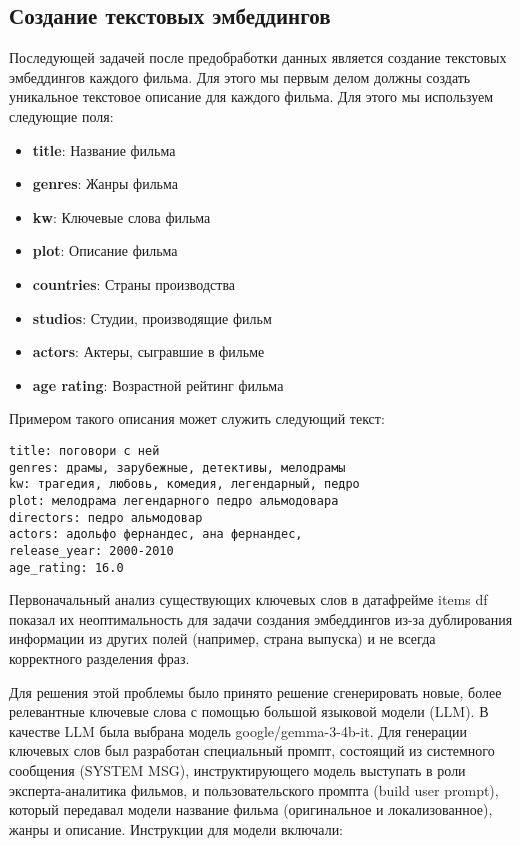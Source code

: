 \subsection*{Создание текстовых эмбеддингов}

Последующей задачей после предобработки данных является создание текстовых эмбеддингов каждого фильма. Для этого мы первым делом должны создать уникальное текстовое описание для каждого фильма. Для этого мы используем следующие поля:
\begin{itemize}
    \item \textbf{title}: Название фильма
    \item \textbf{genres}: Жанры фильма
    \item \textbf{kw}: Ключевые слова фильма
    \item \textbf{plot}: Описание фильма
    \item \textbf{countries}: Страны производства
    \item \textbf{studios}: Студии, производящие фильм
    \item \textbf{actors}: Актеры, сыгравшие в фильме
    \item \textbf{age rating}: Возрастной рейтинг фильма
\end{itemize}

Примером такого описания может служить следующий текст:
\begin{verbatim}
title: поговори с ней
genres: драмы, зарубежные, детективы, мелодрамы
kw: трагедия, любовь, комедия, легендарный, педро
plot: мелодрама легендарного педро альмодовара
directors: педро альмодовар
actors: адольфо фернандес, ана фернандес, 
release_year: 2000-2010
age_rating: 16.0
\end{verbatim}

Первоначальный анализ существующих ключевых слов в датафрейме items df показал их неоптимальность для задачи создания эмбеддингов из-за дублирования информации из других полей (например, страна выпуска) и не всегда корректного разделения фраз.

Для решения этой проблемы было принято решение сгенерировать новые, более релевантные ключевые слова с помощью большой языковой модели (LLM). В качестве LLM была выбрана модель google/gemma-3-4b-it. Для генерации ключевых слов был разработан специальный промпт, состоящий из системного сообщения (SYSTEM MSG), инструктирующего модель выступать в роли эксперта-аналитика фильмов, и пользовательского промпта (build user prompt), который передавал модели название фильма (оригинальное и локализованное), жанры и описание. Инструкции для модели включали:

